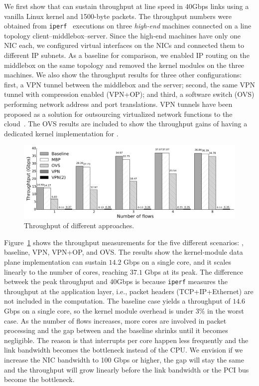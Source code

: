 We first show that  \system can  sustain throughput  at line speed  in
40Gbps links using a vanilla Linux kernel and  1500-byte packets.  The
throughput  numbers  were  obtained  from   {\tt   iperf}~\cite{iperf}
executions  on  three  {\em high-end}  machines   connected  on a line
topology client--middlebox--server.  Since  the high-end machines have
only one NIC  each, we configured virtual interfaces  on  the NICs and
connected them to different IP subnets.  As a baseline for comparison,
we  enabled  IP routing  on the  middlebox  on  the  same topology and
removed the \system kernel modules on the three machines. We also show
the throughput results for  three other  configurations: first, a  VPN
tunnel  between  the middlebox  and the  server; second,  the same VPN
tunnel with compression enabled (VPN+OP); and third, a software switch
(OVS) performing network address  and port translations.   VPN tunnels
have been proposed  as a solution  for outsourcing virtualized network
functions to the cloud~\cite{Aplomb}.  The OVS results are included to
show the throughput gains of  having a dedicated kernel implementation
for \system.


\begin{figure}[ht]

\centering
\includegraphics[width=\linewidth]{figures/throughput.pdf} 

\caption{ Throughput  of  different approaches.}\label{throughput}
\end{figure}

Figure~\ref{throughput} shows the throughput measurements for the five
different scenarios:  \system, baseline,  VPN, VPN+OP,  and  OVS.  The
results show the  \system kernel-module data plane  implementation can
sustain $14.2$ Gbps on  a single core,  and it scales linearly  to the
number of  cores, reaching  $37.1$ Gbps at  its peak.   The difference
betweek the peak throughput and 40Gbps is because {\tt iperf} measures
the throughput  at  the  application    layer, i.e., packet    headers
(TCP+IP+Ethernet) are not  included in the computation.   The baseline
case yields  a  throughput of  $14.6$  Gbps on  a  single core, so the
kernel module overhead  is under  $3\%$ in  the  worst case.   As  the
number of flows    increases,   more cores  are involved   in   packet
processing and the gap between \system  and the baseline shrinks until
it becomes negligible.  The reason  is that interrupts per core happen
less frequently and the link  bandwidth becomes the bottleneck instead
of the CPU. We envision if  we increase the NIC  bandwidth to 100 Gbps
or higher,  the gap will stay the   same and the throughput  will grow
linearly before    the link  bandwidth   or the   PCI bus  become  the
bottleneck.

